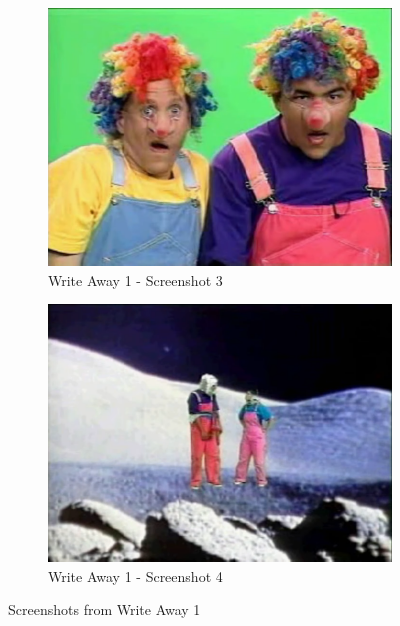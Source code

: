 \begin{figure}[H]
    \begin{subfigure}{0.45\textwidth}
        \centering
        \includegraphics[width=\linewidth]{Games/WriteAway/Images/WriteAway1Screenshot3.png}
        \caption{Write Away 1 - Screenshot 3}
    \end{subfigure}
    \begin{subfigure}{0.45\textwidth}
        \centering
        \includegraphics[width=\linewidth]{Games/WriteAway/Images/WriteAway1Screenshot4.png}
        \caption{Write Away 1 - Screenshot 4}
    \end{subfigure}
    \caption{Screenshots from Write Away 1}
\end{figure}
